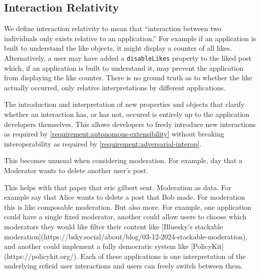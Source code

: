 
\subsection{Interaction Relativity}
\label{concepts:interaction-relativity}

We define interaction relativity to mean that ``interaction between two individuals only
exists relative to an application.''
For example if an application is built to understand the like objects,
it might display a counter of all likes.
Alternatively, a user may have added a \texttt{disableLikes} property to
the liked post which, if an application is built to understand it,
may prevent the application from displaying the like counter.
There is no ground truth as to whether the like actually occurred,
only relative interpretations by different applications.

The introduction and interpretation of new properties and objects
that clarify whether an interaction has, or has not, occured
is entirely up to the application developers themselves.
This allows developers to freely introduce new interactions
as required by \ref{requirement:autonomous-extensibility} without
breaking interoperability as required by \ref{requirement:adversarial-interop}.

This becomes unusual when considering moderation.
For example, day that a Moderator wants to delete another user's post.


This helps with that paper that eric gilbert sent. Moderation as data.
For example say that Alice wants to delete a post that Bob made.
For moderation this is like composable moderation. But also more.
For example, one application could have a single fixed moderator,
another could allow users to choose which moderators they would like filter their content
like [Bluesky's stackable moderation](https://bsky.social/about/blog/03-12-2024-stackable-moderation),
and another could implement a fully democratic system like [PolicyKit](https://policykit.org/).
Each of these applications is one interpretation of the underlying refieid user interactions and
users can freely switch between them.

